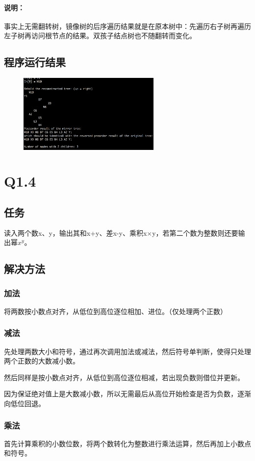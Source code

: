 \documentclass{homework}
\begin{document}
\paragraph{说明：}事实上无需翻转树，镜像树的后序遍历结果就是在原本树中：先遍历右子树再遍历左子树再访问根节点的结果。双孩子结点树也不随翻转而变化。
\subsection{程序运行结果}
\begin{figure}[H]
    \centering
    \includegraphics[width=7cm]{Q1.3/mirror.png}
\end{figure}
\section{Q1.4}
\subsection{任务}
读入两个数x、y，输出其和x+y、差x-y、乘积x$\times$y，若第二个数为整数则还要输出幂$x^y$。
\subsection{解决方法}
\subsubsection{加法}
将两数按小数点对齐，从低位到高位逐位相加、进位。（仅处理两个正数）
\subsubsection{减法}
先处理两数大小和符号，通过再次调用加法或减法，然后符号单判断，使得只处理两个正数的大数减小数。

然后同样是按小数点对齐，从低位到高位逐位相减，若出现负数则借位并更新。

因为保证绝对值上是大数减小数，所以无需最后从高位开始检查是否为负数，逐渐向低位回退。
\subsubsection{乘法}
首先计算乘积的小数位数，将两个数转化为整数进行乘法运算，然后再加上小数点和符号。
\end{document}
